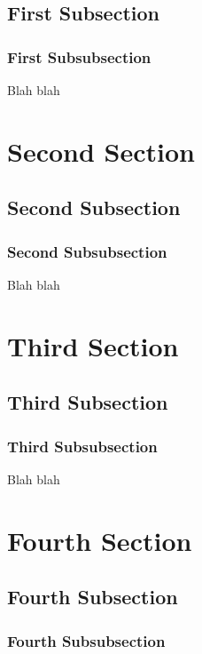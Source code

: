 \documentclass[11pt]{book}
\begin{document}
\subsection{First Subsection}

\subsubsection{First Subsubsection}

Blah blah

\section{Second Section}

\subsection{Second Subsection}

\subsubsection{Second Subsubsection}

Blah blah

\section{Third Section}

\subsection{Third Subsection}

\subsubsection{Third Subsubsection}

Blah blah

\section{Fourth Section}

\subsection{Fourth Subsection}

\subsubsection{Fourth Subsubsection}
\end{document}
